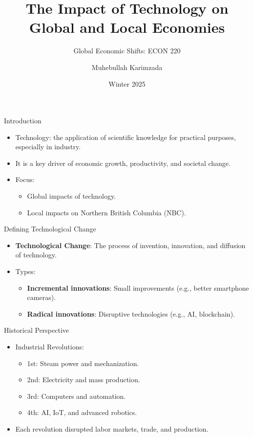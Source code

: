 \documentclass{beamer}
\title{The Impact of Technology on Global and Local Economies}
\subtitle{Global Economic Shifts: ECON 220}
\author{Muhebullah Karimzada}
\date{Winter 2025}
\begin{document}
\frame{\titlepage}

\begin{frame}{Introduction}
    \begin{itemize}
        \item Technology: the application of scientific knowledge for practical purposes, especially in industry.
        \item It is a key driver of economic growth, productivity, and societal change.
        \item Focus:
        \begin{itemize}
            \item Global impacts of technology.
            \item Local impacts on Northern British Columbia (NBC).
        \end{itemize}
    \end{itemize}
\end{frame}

\begin{frame}{Defining Technological Change}
    \begin{itemize}
        \item \textbf{Technological Change}: The process of invention, innovation, and diffusion of technology.
        \item Types:
        \begin{itemize}
            \item \textbf{Incremental innovations}: Small improvements (e.g., better smartphone cameras).
            \item \textbf{Radical innovations}: Disruptive technologies (e.g., AI, blockchain).
        \end{itemize}
    \end{itemize}
\end{frame}

\begin{frame}{Historical Perspective}
    \begin{itemize}
        \item Industrial Revolutions:
        \begin{itemize}
            \item 1st: Steam power and mechanization.
            \item 2nd: Electricity and mass production.
            \item 3rd: Computers and automation.
            \item 4th: AI, IoT, and advanced robotics.
        \end{itemize}
        \item Each revolution disrupted labor markets, trade, and production.
    \end{itemize}
\end{frame}
\end{document}
